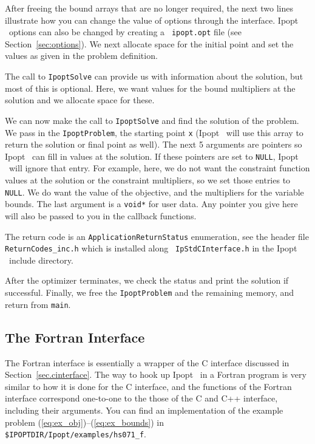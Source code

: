 \documentclass[10pt]{article}
\newcommand{\Ipopt}{{\sc Ipopt }}
\begin{document}
After freeing the bound arrays that are no longer required, the next
two lines illustrate how you can change the value of options through
the interface.  \Ipopt\ options can also be changed by creating a {\tt
ipopt.opt} file (see Section~\ref{sec:options}). We next allocate
space for the initial point and set the values as given in the problem
definition.

The call to {\tt IpoptSolve} can provide us with information about the
solution, but most of this is optional. Here, we want values for the
bound multipliers at the solution and we allocate space for these.

We can now make the call to {\tt IpoptSolve} and find the solution of
the problem. We pass in the {\tt IpoptProblem}, the starting point
{\tt x} (\Ipopt\ will use this array to return the solution or final
point as well).  The next 5 arguments are pointers so \Ipopt\ can fill
in values at the solution.  If these pointers are set to {\tt NULL},
\Ipopt\ will ignore that entry.  For example, here, we do not want the
constraint function values at the solution or the constraint
multipliers, so we set those entries to {\tt NULL}. We do want the
value of the objective, and the multipliers for the variable bounds.
The last argument is a {\tt void*} for user data. Any pointer you give
here will also be passed to you in the callback functions.

The return code is an {\tt ApplicationReturnStatus} enumeration, see
the header file {\tt ReturnCodes\_inc.h} which is installed along {\tt
  IpStdCInterface.h} in the \Ipopt\ include directory.

After the optimizer terminates, we check the status and print the
solution if successful. Finally, we free the {\tt IpoptProblem} and
the remaining memory, and return from {\tt main}.

\subsection{The Fortran Interface}

The Fortran interface is essentially a wrapper of the C interface
discussed in Section~\ref{sec.cinterface}.  The way to hook up \Ipopt\
in a Fortran program is very similar to how it is done for the C
interface, and the functions of the Fortran interface correspond
one-to-one to the those of the C and C++ interface, including their
arguments.  You can find an implementation of the example problem
(\ref{eq:ex_obj})--(\ref{eq:ex_bounds}) in {\tt
  \$IPOPTDIR/Ipopt/examples/hs071\_f}.
\end{document}
